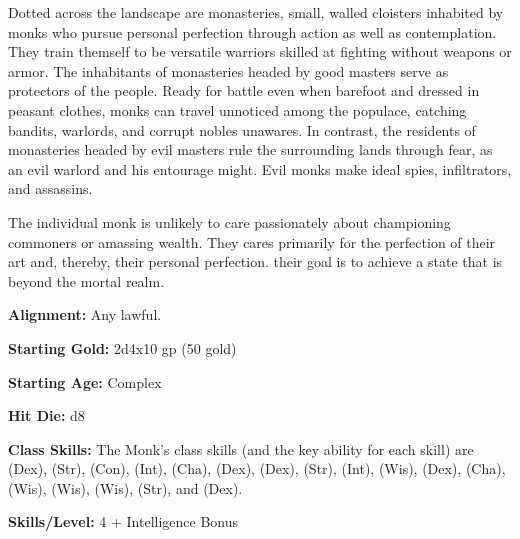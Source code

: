
Dotted across the landscape are monasteries, small, walled cloisters inhabited by monks who pursue personal perfection through action as well as contemplation. They train themself to be versatile warriors skilled at fighting without weapons or armor. The inhabitants of monasteries headed by good masters serve as protectors of the people. Ready for battle even when barefoot and dressed in peasant clothes, monks can travel unnoticed among the populace, catching bandits, warlords, and corrupt nobles unawares. In contrast, the residents of monasteries headed by evil masters rule the surrounding lands through fear, as an evil warlord and his entourage might. Evil monks make ideal spies, infiltrators, and assassins.

The individual monk is unlikely to care passionately about championing commoners or amassing wealth. They cares primarily for the perfection of their art and, thereby, their personal perfection. their goal is to achieve a state that is beyond the mortal realm.

\textbf{Alignment:} Any lawful.

\textbf{Starting Gold:} 2d4x10 gp (50 gold)

\textbf{Starting Age:} Complex

\textbf{Hit Die:} d8

\textbf{Class Skills:} The Monk's class skills (and the key ability for each skill) are  (Dex),  (Str),  (Con),  (Int),  (Cha),  (Dex),  (Dex),  (Str),  (Int),  (Wis),  (Dex),  (Cha),  (Wis),  (Wis),  (Wis),  (Str), and  (Dex).

\textbf{Skills/Level:} 4 + Intelligence Bonus

\goodbab{}
\goodfor{}
\goodref{}
\goodwil{}

